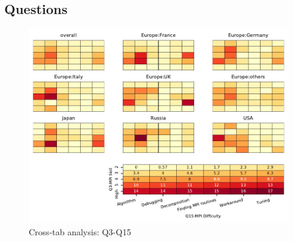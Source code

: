 
\subsection{Questions}


\begin{figure}
\begin{center}
\includegraphics[width=12cm]{../pdfs/Q3-Q15.pdf}
\caption{Cross-tab analysis: Q3-Q15}
\label{fig:Q3-Q15}
\end{center}
\end{figure}
